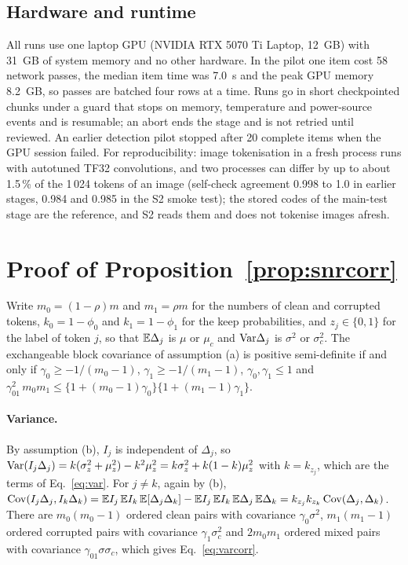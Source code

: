 \subsection{Hardware and runtime}\label{app:hardware}
All runs use one laptop GPU (NVIDIA RTX 5070 Ti Laptop, 12~GB) with 31~GB of system memory and no other hardware.
In the pilot one item cost 58 network passes, the median item time was 7.0~s and the peak GPU memory 8.2~GB, so passes are batched
four rows at a time.
Runs go in short checkpointed chunks under a guard that stops on memory, temperature and power-source events and is resumable; an
abort ends the stage and is not retried until reviewed.
An earlier detection pilot stopped after 20 complete items when the GPU session failed.
For reproducibility: image tokenisation in a fresh process runs with autotuned TF32 convolutions, and two processes can differ by up to
about 1.5\,\% of the 1\,024 tokens of an image (self-check agreement 0.998 to 1.0 in earlier stages, 0.984 and 0.985 in the S2 smoke
test); the stored codes of the main-test stage are the reference, and S2 reads them and does not tokenise images afresh.

\section{Proof of Proposition~\ref{prop:snrcorr}}\label{app:snrcorr}
Write $m_0=(1-\rho)m$ and $m_1=\rho m$ for the numbers of clean and corrupted tokens, $k_0=1-\phi_0$ and $k_1=1-\phi_1$ for the keep
probabilities, and $z_j\in\{0,1\}$ for the label of token $j$, so that $\mathbb{E}\Delta_j$ is $\mu$ or $\mu_c$ and $\mathrm{Var}\Delta_j$ is $\sigma^2$ or
$\sigma_c^2$.
The exchangeable block covariance of assumption (a) is positive semi-definite if and only if $\gamma_0\ge-1/(m_0-1)$,
$\gamma_1\ge-1/(m_1-1)$, $\gamma_0,\gamma_1\le1$ and $\gamma_{01}^2\,m_0m_1\le\{1+(m_0-1)\gamma_0\}\{1+(m_1-1)\gamma_1\}$.

\paragraph{Variance.}
By assumption (b), $I_j$ is independent of $\Delta_j$, so
$\mathrm{Var}(I_j\Delta_j)=k(\sigma_z^2+\mu_z^2)-k^2\mu_z^2=k\sigma_z^2+k(1-k)\mu_z^2$ with $k=k_{z_j}$, which are the terms of Eq.~\eqref{eq:var}.
For $j\neq k$, again by (b),
$\mathrm{Cov}(I_j\Delta_j,I_k\Delta_k)=\mathbb{E} I_j\,\mathbb{E} I_k\,\mathbb{E}[\Delta_j\Delta_k]-\mathbb{E} I_j\,\mathbb{E} I_k\,\mathbb{E}\Delta_j\,\mathbb{E}\Delta_k=k_{z_j}k_{z_k}\,\mathrm{Cov}(\Delta_j,\Delta_k)$.
There are $m_0(m_0-1)$ ordered clean pairs with covariance $\gamma_0\sigma^2$, $m_1(m_1-1)$ ordered corrupted pairs with covariance
$\gamma_1\sigma_c^2$ and $2m_0m_1$ ordered mixed pairs with covariance $\gamma_{01}\sigma\sigma_c$, which gives Eq.~\eqref{eq:varcorr}.

